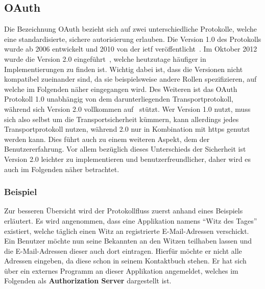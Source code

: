 \subsection{OAuth}\label{subsec:oauth}
	Die Bezeichnung OAuth bezieht sich auf zwei unterschiedliche Protokolle,
	welche eine standardisierte,
	sichere \gls{autorisierung} erlauben.
	Die Version 1.0 des Protokolls wurde ab 2006 entwickelt
	und 2010 von der \gls{ietf} veröffentlicht~\cite[Vgl.][]{rfc5849}.
	Im Oktober 2012 wurde die Version 2.0 eingeführt~\cite[Vgl.][]{rfc6749},
	welche heutzutage häufiger in Implementierungen zu finden ist.
	Wichtig dabei ist,
	dass die Versionen nicht kompatibel zueinander sind,
	da sie beispielsweise andere Rollen spezifizieren,
	auf welche im Folgenden näher eingegangen wird.
	Des Weiteren ist das OAuth Protokoll 1.0 unabhängig von dem darunterliegenden Transportprotokoll,
	während sich Version 2.0 vollkommen auf~ stützt.
	Wer Version 1.0 nutzt,
	muss sich also selbst um die Transportsicherheit kümmern,
	kann allerdings jedes Transportprotokoll nutzen,
	während 2.0 nur in Kombination mit \gls{https} genutzt werden kann.
	Dies führt auch zu einem weiteren Aspekt,
	dem der Benutzererfahrung.
	Vor allem bezüglich dieses Unterschieds der Sicherheit ist Version 2.0 leichter zu implementieren
	und benutzerfreundlicher,
	daher wird es auch im Folgenden näher betrachtet.

	\subsubsection{Beispiel}\label{subsubsec:beispiel}
		Zur besseren Übersicht wird der Protokollfluss zuerst anhand eines Beispiels erläutert.
		Es wird angenommen,
		dass eine Applikation namens \enquote{Witz des Tages} existiert,
		welche täglich einen Witz an registrierte E-Mail-Adressen verschickt.
		Ein Benutzer möchte nun seine Bekannten an den Witzen teilhaben lassen
		und die E-Mail-Adressen dieser auch dort eintragen.
		Hierfür möchte er nicht alle Adressen eingeben,
		da diese schon in seinem Kontaktbuch stehen.
		Er hat sich über ein externes Programm an dieser Applikation angemeldet,
		welches im Folgenden als \textbf{Authorization Server} dargestellt ist.

